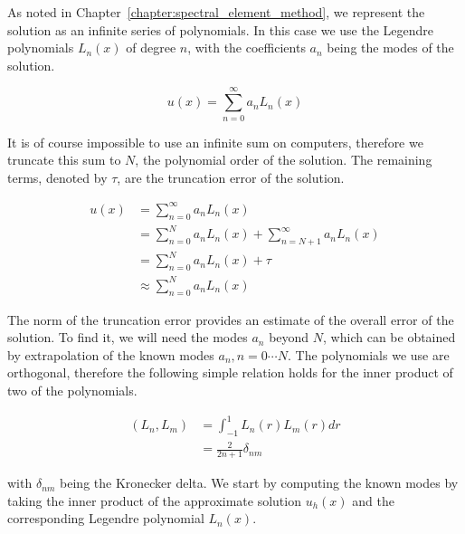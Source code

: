 As noted in Chapter~\ref{chapter:spectral_element_method}, we represent the solution as an infinite
series of polynomials. In this case we use the Legendre polynomials \(L_n(x)\) of degree \(n\), with
the coefficients \(a_n\) being the modes of the solution.

\begin{equation} \label{equ:infinite_sum_amr}
    u(x) = \sum_{n = 0}^{\infty}a_n L_n(x)
\end{equation}

It is of course impossible to use an infinite sum on computers, therefore we truncate this sum to
\(N\), the polynomial order of the solution. The remaining terms, denoted by \(\tau \), are the
truncation error of the solution.

\begin{equation} \label{equ:solution_approximation}
    \begin{aligned}
        u(x) & = \sum_{n = 0}^{\infty } a_n L_n(x)                                 \\
             & = \sum_{n = 0}^{N}a_n L_n(x) + \sum_{n = N + 1}^{\infty }a_n L_n(x) \\
             & = \sum_{n = 0}^{N}a_n L_n(x) + \tau                                 \\
             & \approx \sum_{n = 0}^{N}a_n L_n(x)
    \end{aligned}
\end{equation}

The norm of the truncation error provides an estimate of the overall error of the solution. To find
it, we will need the modes \(a_n\) beyond \(N\), which can be obtained by extrapolation of the known
modes \(a_n, n = 0 \cdots N\). The polynomials we use are orthogonal, therefore the following simple
relation holds for the inner product of two of the polynomials.

\begin{equation} \label{equ:polynomial_orthogonality}
    \begin{aligned}
        \left( L_n, L_m \right) & = \int_{-1}^{1}L_n(r)L_m(r)dr   \\
                                & = \frac{2}{2n + 1}\delta _{n m}
    \end{aligned}
\end{equation}

\noindent
with \(\delta_{n m}\) being the Kronecker delta. We start by computing the known modes by taking the
inner product of the approximate solution \(u_h(x)\) and  the corresponding Legendre polynomial
\(L_n(x)\).

